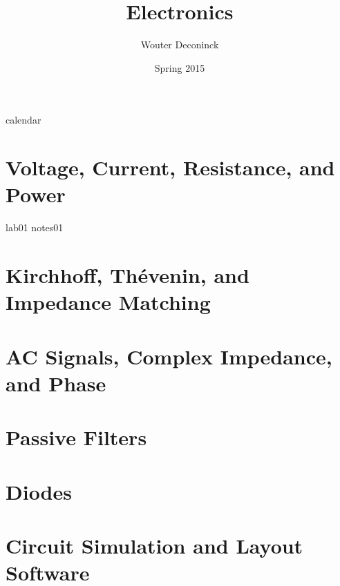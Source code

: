 \documentclass{book}
\title{Electronics}
\date{Spring 2015}
\author{Wouter Deconinck}
\begin{document}
\maketitle

{calendar}

\tableofcontents

\chapter{Voltage, Current, Resistance, and Power}

{lab01}
{notes01}

\chapter{Kirchhoff, Th\'{e}venin, and Impedance Matching}

\graphicspath{{lab02/}}



\chapter{AC Signals, Complex Impedance, and Phase}

\graphicspath{{lab03/}}



\chapter{Passive Filters}

\graphicspath{{lab04/}}



\chapter{Diodes}

\graphicspath{{lab05/}}



\chapter{Circuit Simulation and Layout Software}

\graphicspath{{lab06/}}


\end{document}
